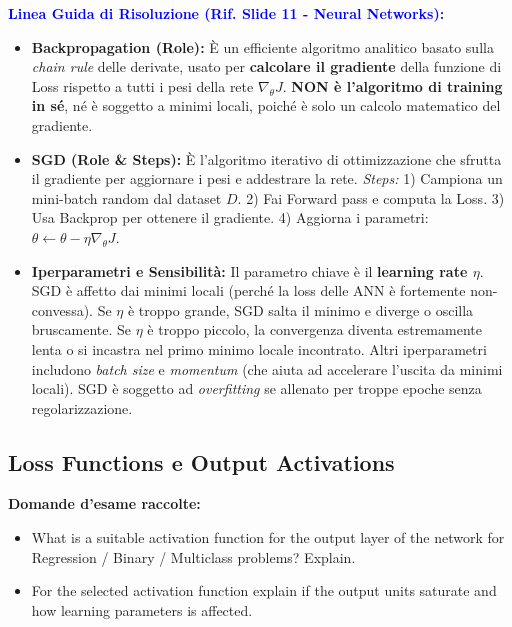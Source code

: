 \documentclass[11pt,a4paper]{article}
\begin{document}
\textbf{\textcolor{blue}{Linea Guida di Risoluzione (Rif. Slide 11 - Neural Networks):}}
\begin{itemize}
    \item \textbf{Backpropagation (Role):} È un efficiente algoritmo analitico basato sulla \textit{chain rule} delle derivate, usato per \textbf{calcolare il gradiente} della funzione di Loss rispetto a tutti i pesi della rete $\nabla_\theta J$. \textbf{NON è l'algoritmo di training in sé}, né è soggetto a minimi locali, poiché è solo un calcolo matematico del gradiente.
    \item \textbf{SGD (Role \& Steps):} È l'algoritmo iterativo di ottimizzazione che sfrutta il gradiente per aggiornare i pesi e addestrare la rete. \textit{Steps:} 1) Campiona un mini-batch random dal dataset $D$. 2) Fai Forward pass e computa la Loss. 3) Usa Backprop per ottenere il gradiente. 4) Aggiorna i parametri: $\theta \leftarrow \theta - \eta \nabla_\theta J$.
    \item \textbf{Iperparametri e Sensibilità:} Il parametro chiave è il \textbf{learning rate $\eta$}. SGD è affetto dai minimi locali (perché la loss delle ANN è fortemente non-convessa). Se $\eta$ è troppo grande, SGD salta il minimo e diverge o oscilla bruscamente. Se $\eta$ è troppo piccolo, la convergenza diventa estremamente lenta o si incastra nel primo minimo locale incontrato. Altri iperparametri includono \textit{batch size} e \textit{momentum} (che aiuta ad accelerare l'uscita da minimi locali). SGD è soggetto ad \textit{overfitting} se allenato per troppe epoche senza regolarizzazione.
\end{itemize}

\subsection{Loss Functions e Output Activations}
\textbf{Domande d'esame raccolte:}
\begin{itemize}
    \item What is a suitable activation function for the output layer of the network for Regression / Binary / Multiclass problems? Explain.
    \item For the selected activation function explain if the output units saturate and how learning parameters is affected.
\end{itemize}
\end{document}
